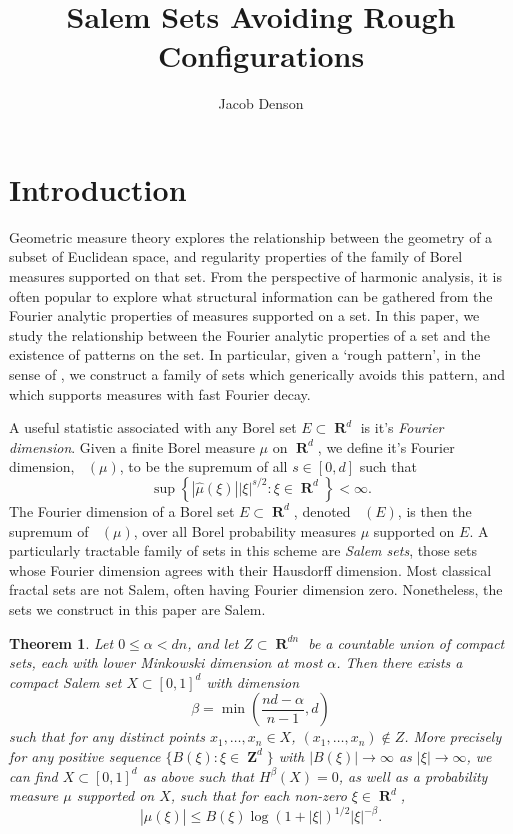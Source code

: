 \documentclass[12pt,reqno]{article}
\title{Salem Sets Avoiding Rough Configurations}
\author{Jacob Denson}
\numberwithin{equation}{section}
\DeclareMathOperator{\fordim}{\dim_{\mathbf{F}}}
\DeclareMathOperator{\RR}{\mathbf{R}}
\DeclareMathOperator{\ZZ}{\mathbf{Z}}
\newtheorem{theorem}{Theorem}
\begin{document}
\maketitle

\section{Introduction}

Geometric measure theory explores the relationship between the geometry of a subset of Euclidean space, and regularity properties of the family of Borel measures supported on that set. From the perspective of harmonic analysis, it is often popular to explore what structural information can be gathered from the Fourier analytic properties of measures supported on a set. In this paper, we study the relationship between the Fourier analytic properties of a set and the existence of patterns on the set. In particular, given a `rough pattern', in the sense of \cite{OurPaper}, we construct a family of sets which generically avoids this pattern, and which supports measures with fast Fourier decay.

A useful statistic associated with any Borel set $E \subset \RR^d$ is it's \emph{Fourier dimension}. Given a finite Borel measure $\mu$ on $\RR^d$, we define it's Fourier dimension, $\fordim(\mu)$, to be the supremum of all $s \in [0,d]$ such that
%
\begin{equation} \label{fordim}
    \sup \left\{ |\widehat{\mu}(\xi)| |\xi|^{s/2} : \xi \in \RR^d \right\} < \infty.
\end{equation}
%
The Fourier dimension of a Borel set $E \subset \RR^d$, denoted $\fordim(E)$, is then the supremum of $\fordim(\mu)$, over all Borel probability measures $\mu$ supported on $E$. A particularly tractable family of sets in this scheme are \emph{Salem sets}, those sets whose Fourier dimension agrees with their Hausdorff dimension. Most classical fractal sets are not Salem, often having Fourier dimension zero. Nonetheless, the sets we construct in this paper are Salem.

\begin{theorem} \label{maintheorem}
    Let $0 \leq \alpha < dn$, and let $Z \subset \RR^{dn}$ be a countable union of compact sets, each with lower Minkowski dimension at most $\alpha$. Then there exists a compact Salem set $X \subset [0,1]^d$ with dimension
    \[ \beta = \min \left( \frac{nd - \alpha}{n-1}, d \right) \]
    such that for any distinct points $x_1, \dots, x_n \in X$, $(x_1, \dots, x_n) \not \in Z$. More precisely for any positive sequence $\{ B(\xi) : \xi \in \ZZ^d \}$ with $|B(\xi)| \to \infty$ as $|\xi| \to \infty$, we can find $X \subset [0,1]^d$ as above such that $H^\beta(X) = 0$, as well as a probability measure $\mu$ supported on $X$, such that for each non-zero $\xi \in \RR^d$,
    \[ |\widehat{\mu}(\xi)| \leq B(\xi) \log(1 + |\xi|)^{1/2} |\xi|^{-\beta}. \]
\end{theorem}
\end{document}
